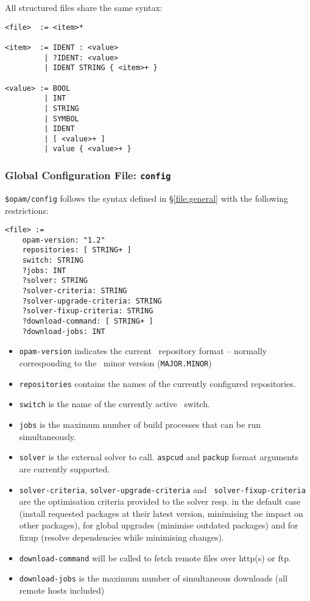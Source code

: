 \documentclass[a4paper,10pt]{article}
\begin{document}
All structured files share the same syntax:

\begin{Verbatim}
<file>  := <item>*

<item>  := IDENT : <value>
         | ?IDENT: <value>
         | IDENT STRING { <item>+ }

<value> := BOOL
         | INT
         | STRING
         | SYMBOL
         | IDENT
         | [ <value>+ ]
         | value { <value>+ }
\end{Verbatim}

\subsubsection{Global Configuration File: {\tt config}}
\label{file:config}

\verb+$opam/config+ follows the syntax defined in \S\ref{file:general} with
the following restrictions:

\begin{Verbatim}
<file> :=
    opam-version: "1.2"
    repositories: [ STRING+ ]
    switch: STRING
    ?jobs: INT
    ?solver: STRING
    ?solver-criteria: STRING
    ?solver-upgrade-criteria: STRING
    ?solver-fixup-criteria: STRING
    ?download-command: [ STRING+ ]
    ?download-jobs: INT
\end{Verbatim}

\begin{itemize}
\item {\tt opam-version} indicates the current \OPAM\ repository format --
  normally corresponding to the \OPAM\ minor version (\verb+MAJOR.MINOR+)
\item {\tt repositories} contains the names of the currently configured
  repositories.
\item {\tt switch} is the name of the currently active \OPAM\ switch.
\item {\tt jobs} is the maximum number of build processes that can be run
  simultaneously.
\item {\tt solver} is the external solver to call. \verb+aspcud+ and
  \verb+packup+ format arguments are currently supported.
\item {\tt solver-criteria}, {\tt solver-upgrade-criteria} and {\tt
    solver-fixup-criteria} are the optimisation criteria provided to the solver
  resp. in the default case (install requested packages at their latest version,
  minimising the impact on other packages), for global upgrades (minimise
  outdated packages) and for fixup (resolve dependencies while minimising
  changes).
\item {\tt download-command} will be called to fetch remote files over http(s)
  or ftp.
\item {\tt download-jobs} is the maximum number of simultaneous downloads (all
  remote hosts included)
\end{itemize}
\end{document}
